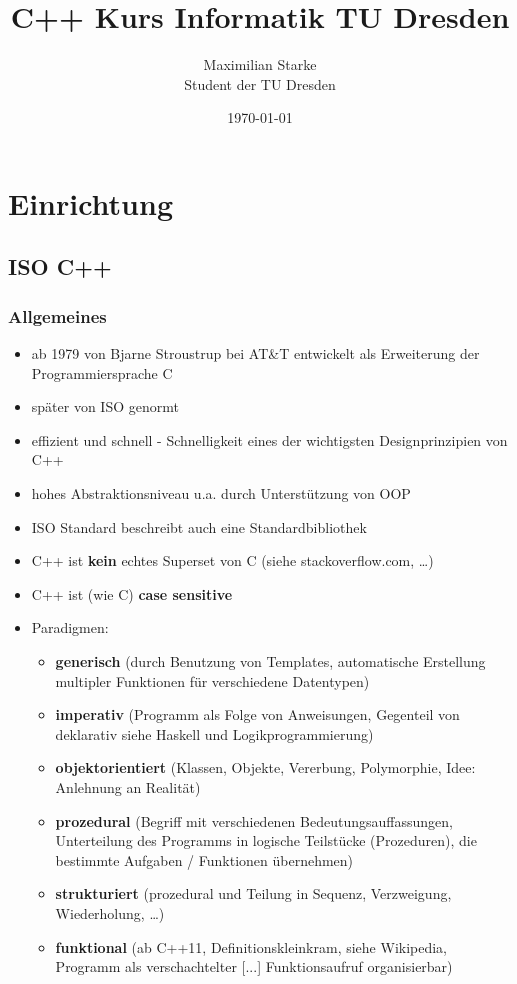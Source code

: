 \documentclass[a4paper]{report}
\title{C++ Kurs Informatik TU Dresden}
\author{Maximilian Starke \\ Student der TU Dresden}
\date{\today}
\theoremstyle{nonumberplain}
\begin{document}
\maketitle
\tableofcontents

\chapter{Einrichtung}

\section{ISO C++}

\subsection{Allgemeines}
\begin{itemize}
\item ab 1979 von Bjarne Stroustrup bei AT\&T entwickelt als Erweiterung der Programmiersprache C
\item später von ISO genormt
\vspace{2ex}
\item effizient und schnell - Schnelligkeit eines der wichtigsten Designprinzipien von C++
\item hohes Abstraktionsniveau u.a. durch Unterstützung von OOP
\item ISO Standard beschreibt auch eine Standardbibliothek
\item C++ ist \textbf{kein} echtes Superset von C (siehe stackoverflow.com, \dots)%
\item C++ ist (wie C) \textbf{case sensitive}
\vspace{2ex}
\item Paradigmen:
	\begin{itemize}
		\item \textbf{generisch} (durch Benutzung von Templates, automatische Erstellung multipler Funktionen für verschiedene Datentypen)
		\item \textbf{imperativ} (Programm als Folge von Anweisungen, Gegenteil von deklarativ siehe Haskell und Logikprogrammierung)
		\item \textbf{objektorientiert} (Klassen, Objekte, Vererbung, Polymorphie, Idee: Anlehnung an Realität)
		\item \textbf{prozedural} (Begriff mit verschiedenen Bedeutungsauffassungen, Unterteilung des Programms in logische Teilstücke (Prozeduren), die bestimmte Aufgaben / Funktionen übernehmen)
		\item \textbf{strukturiert} (prozedural und Teilung in Sequenz, Verzweigung, Wiederholung, \dots )
		\item \textbf{funktional} (ab C++11, Definitionskleinkram, siehe Wikipedia, Programm als verschachtelter [...] Funktionsaufruf 	organisierbar)
	\end{itemize}
\end{itemize}
\end{document}
